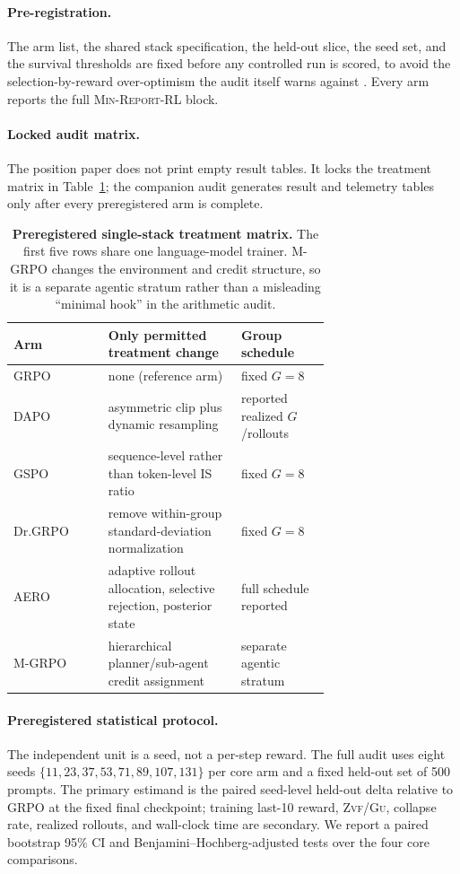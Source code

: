 \documentclass[11pt]{article}
\newcommand{\zvf}{\textsc{Zvf}}
\newcommand{\gu}{\textsc{Gu}}
\newcommand{\minreport}{\textsc{Min-Report-RL}}
\begin{document}
\paragraph{Pre-registration.}
The arm list, the shared stack specification, the held-out slice, the seed set,
and the survival thresholds are fixed before any controlled run is scored, to
avoid the selection-by-reward over-optimism the audit itself warns against
\cite{zvfaudit2026}. Every arm reports the full \minreport{} block.

\paragraph{Locked audit matrix.}
The position paper does not print empty result tables. It locks the treatment
matrix in Table~\ref{tab:audit-protocol}; the companion audit generates result
and telemetry tables only after every preregistered arm is complete.

\begin{table}[t]
\centering
\caption{\textbf{Preregistered single-stack treatment matrix.} The first five
rows share one language-model trainer. M-GRPO changes the environment and credit
structure, so it is a separate agentic stratum rather than a misleading
``minimal hook'' in the arithmetic audit.}
\label{tab:audit-protocol}
\small
\begin{tabular}{@{}lp{0.42\linewidth}p{0.28\linewidth}@{}}
\toprule
\textbf{Arm} & \textbf{Only permitted treatment change} & \textbf{Group schedule}\\
\midrule
GRPO & none (reference arm) & fixed $G=8$\\
DAPO & asymmetric clip plus dynamic resampling & reported realized $G$/rollouts\\
GSPO & sequence-level rather than token-level IS ratio & fixed $G=8$\\
Dr.GRPO & remove within-group standard-deviation normalization & fixed $G=8$\\
AERO & adaptive rollout allocation, selective rejection, posterior state & full schedule reported\\
M-GRPO & hierarchical planner/sub-agent credit assignment & separate agentic stratum\\
\bottomrule
\end{tabular}
\end{table}

\paragraph{Preregistered statistical protocol.}
The independent unit is a seed, not a per-step reward. The full audit uses
eight seeds $\{11,23,37,53,71,89,107,131\}$ per core arm and a fixed held-out
set of 500 prompts. The primary estimand is the paired seed-level held-out
delta relative to GRPO at the fixed final checkpoint; training last-10 reward,
\zvf{}/\gu{}, collapse rate, realized rollouts, and wall-clock time are
secondary. We report a paired bootstrap 95\% CI and Benjamini--Hochberg-adjusted
tests over the four core comparisons.
\end{document}
